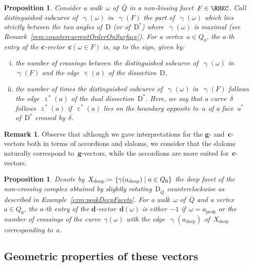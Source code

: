 \documentclass{amsart}
\newtheorem{proposition}[theorem]{Proposition}
\theoremstyle{definition}
\newtheorem{remark}[theorem]{Remark}
\renewcommand{\b}[1]{\mathbf{#1}} %
\newcommand{\set}[2]{\left\{ #1 \;\middle|\; #2 \right\}} %
\newcommand{\eqdef}{\mbox{\,\raisebox{0.2ex}{\scriptsize\ensuremath{\mathrm:}}\ensuremath{=}\,}} %
\newcommand{\darkblue}{\color{darkblue}} %
\newcommand{\defn}[1]{\textsl{\darkblue #1}} %
\newcommand{\peak}{\mathrm{peak}} %
\newcommand{\deep}{\mathrm{deep}} %
\newcommand{\dual}{^*} %
\newcommand{\dissection}{\mathrm{D}} %
\newcommand{\curveof}{\operatorname{\gamma}} %
\newcommand{\edgeof}{\operatorname{\varepsilon}} %
\newcommand{\dualedgeof}{\operatorname{\varepsilon}\dual} %
\newcommand{\dvector}[1]{\mathbf{d}(#1)} %
\newcommand{\cvector}[2]{\mathbf{c}(#1 \in #2)} %
\begin{document}
\begin{proposition}
\label{prop:cVectorsSurface}
Consider a walk~$\omega$ of~$\bar Q$ in a non-kissing facet~$F \in \RNKC$.
Call \defn{distinguished subcurve} of~$\curveof(\omega)$ in~$\curveof(F)$ the part of~$\curveof(\omega)$ which lies strictly between the two angles of~$\dissection$ (or of~$\dissection\dual$) where~$\curveof(\omega)$ is maximal (see Remark~\ref{rem:countercurrentOrderOnSurface}).
For a vertex~$a \in Q_0$, the $a$-th entry of the $\b{c}$-vector~$\cvector{\omega}{F}$ is, up to the sign, given by:
\begin{enumerate}[(i)]
\item the number of crossings between the distinguished subcurve of~$\curveof(\omega)$ in~$\curveof(F)$ and the edge~$\edgeof(a)$ of the dissection~$\dissection$,
\item the number of times the distinguished subcurve of~$\curveof(\omega)$ in~$\curveof(F)$ follows the edge~$\dualedgeof(a)$ of the dual dissection~$\dissection\dual$. Here, we say that a curve~$\delta$ follows~$\dualedgeof(a)$ if~$\dualedgeof(a)$ lies on the boundary opposite to~$u$ of a face~$u\dual$ of~$\dissection\dual$ crossed by~$\delta$.
\end{enumerate}
\end{proposition}

\begin{remark}
Observe that although we gave interpretations for the $\b{g}$- and~$\b{c}$-vectors both in terms of accordions and slaloms, we consider that the slaloms naturally correspond to~$\b{g}$-vectors, while the accordions are more suited for~$\b{c}$-vectors.
\end{remark}

\begin{proposition}
\label{prop:dVectorsSurface}
Denote by~$X_\deep \eqdef \set{\curveof(a_\deep)}{a \in Q_0}$ the deep facet of the non-crossing complex obtained by slightly rotating~$\dissection_{\bar Q}$ counterclockwise as described in Example~\ref{exm:peakDeepFacets}.
For a walk~$\omega$ of~$\bar Q$ and a vertex~$a \in Q_0$, the $a$-th entry of the $\b{d}$-vector~$\dvector{\omega}$ is either~$-1$ if~$\omega = a_\peak$ or the number of crossings of the curve~$\gamma(\omega)$ with the edge~$\curveof(a_\deep)$ of~$X_\deep$ corresponding to~$a$.
\end{proposition}

\subsection{Geometric properties of these vectors}
\label{subsec:geometricProperties}
\end{document}

